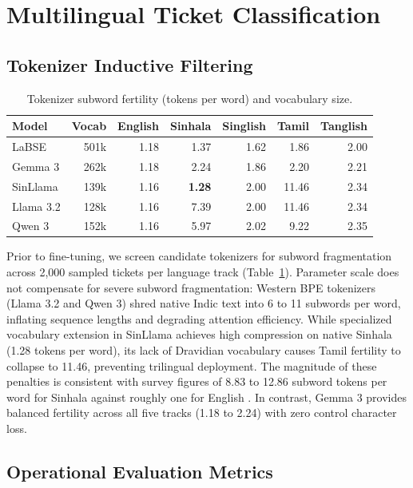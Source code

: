 \section{Multilingual Ticket Classification}
\label{sec:classifiers}

\subsection{Tokenizer Inductive Filtering}

\begin{table}[!htbp]
\caption{Tokenizer subword fertility (tokens per word) and vocabulary size.}
\label{tab:tokenizer_fertility}
\centering
\small
\setlength{\tabcolsep}{2.8pt}
\begin{tabular}{@{}lrrrrrr@{}}
\toprule
Model & Vocab & English & Sinhala & Singlish & Tamil & Tanglish \\
\midrule
LaBSE & 501k & 1.18 & 1.37 & 1.62 & 1.86 & 2.00 \\
Gemma 3 & 262k & 1.18 & 2.24 & 1.86 & 2.20 & 2.21 \\
SinLlama & 139k & 1.16 & \textbf{1.28} & 2.00 & 11.46 & 2.34 \\
Llama 3.2 & 128k & 1.16 & 7.39 & 2.00 & 11.46 & 2.34 \\
Qwen 3 & 152k & 1.16 & 5.97 & 2.02 & 9.22 & 2.35 \\
\bottomrule
\end{tabular}
\end{table}

Prior to fine-tuning, we screen candidate tokenizers for subword fragmentation across 2{,}000 sampled tickets per language track (Table~\ref{tab:tokenizer_fertility}). Parameter scale does not compensate for severe subword fragmentation: Western BPE tokenizers (Llama 3.2 and Qwen 3) shred native Indic text into 6 to 11 subwords per word, inflating sequence lengths and degrading attention efficiency. While specialized vocabulary extension in SinLlama \cite{aravinda2025sinllama} achieves high compression on native Sinhala (1.28 tokens per word), its lack of Dravidian vocabulary causes Tamil fertility to collapse to 11.46, preventing trilingual deployment. The magnitude of these penalties is consistent with survey figures of 8.83 to 12.86 subword tokens per word for Sinhala against roughly one for English \cite{desilva2019sinhalasurvey}. In contrast, Gemma 3 provides balanced fertility across all five tracks (1.18 to 2.24) with zero control character loss.

\subsection{Operational Evaluation Metrics}

